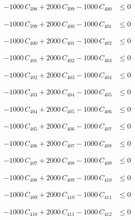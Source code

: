 \documentclass[a4paper,11pt]{article}
\begin{document}
\begin{align}
-1000\,C_{398} + 2000\,C_{399} - 1000\,C_{400} &\leq 0 \nonumber
\end{align}

\begin{align}
-1000\,C_{399} + 2000\,C_{400} - 1000\,C_{401} &\leq 0 \nonumber
\end{align}

\begin{align}
-1000\,C_{400} + 2000\,C_{401} - 1000\,C_{402} &\leq 0 \nonumber
\end{align}

\begin{align}
-1000\,C_{401} + 2000\,C_{402} - 1000\,C_{403} &\leq 0 \nonumber
\end{align}

\begin{align}
-1000\,C_{402} + 2000\,C_{403} - 1000\,C_{404} &\leq 0 \nonumber
\end{align}

\begin{align}
-1000\,C_{403} + 2000\,C_{404} - 1000\,C_{405} &\leq 0 \nonumber
\end{align}

\begin{align}
-1000\,C_{404} + 2000\,C_{405} - 1000\,C_{406} &\leq 0 \nonumber
\end{align}

\begin{align}
-1000\,C_{405} + 2000\,C_{406} - 1000\,C_{407} &\leq 0 \nonumber
\end{align}

\begin{align}
-1000\,C_{406} + 2000\,C_{407} - 1000\,C_{408} &\leq 0 \nonumber
\end{align}

\begin{align}
-1000\,C_{407} + 2000\,C_{408} - 1000\,C_{409} &\leq 0 \nonumber
\end{align}

\begin{align}
-1000\,C_{408} + 2000\,C_{409} - 1000\,C_{410} &\leq 0 \nonumber
\end{align}

\begin{align}
-1000\,C_{409} + 2000\,C_{410} - 1000\,C_{411} &\leq 0 \nonumber
\end{align}

\begin{align}
-1000\,C_{410} + 2000\,C_{411} - 1000\,C_{412} &\leq 0 \nonumber
\end{align}
\end{document}
